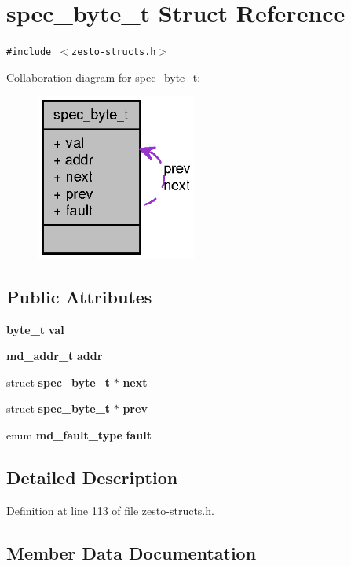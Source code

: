 \section{spec\_\-byte\_\-t Struct Reference}
\label{structspec__byte__t}
{\tt \#include $<$zesto-structs.h$>$}

Collaboration diagram for spec\_\-byte\_\-t:\nopagebreak
\begin{figure}[H]
\begin{center}
\leavevmode
\includegraphics[width=149pt]{structspec__byte__t__coll__graph}
\end{center}
\end{figure}
\subsection*{Public Attributes}
\begin{CompactItemize}
\item 
{\bf byte\_\-t} {\bf val}
\item 
{\bf md\_\-addr\_\-t} {\bf addr}
\item 
struct {\bf spec\_\-byte\_\-t} $\ast$ {\bf next}
\item 
struct {\bf spec\_\-byte\_\-t} $\ast$ {\bf prev}
\item 
enum {\bf md\_\-fault\_\-type} {\bf fault}
\end{CompactItemize}


\subsection{Detailed Description}


Definition at line 113 of file zesto-structs.h.

\subsection{Member Data Documentation}
